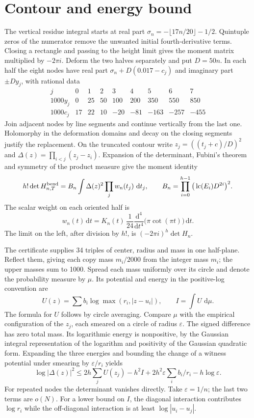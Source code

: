 \documentclass[11pt]{article}
\newcommand{\dd}{\,\mathrm d}
\begin{document}
\section{Contour and energy bound}
The vertical residue integral starts at real part
$\sigma_n=-\lfloor17n/20\rfloor-1/2$. Quintuple zeros of the numerator
remove the unwanted initial fourth-derivative terms. Closing a rectangle
and passing to the height limit gives the moment matrix multiplied by
$-2\pi i$. Deform the two halves separately and put $D=50n$. In each half
the eight nodes have real part $\sigma_n+D(0.017-c_j)$ and imaginary
part $\pm D y_j$, with rational data
\[
\begin{array}{c|rrrrrrrr}
j&0&1&2&3&4&5&6&7\\ \hline
1000y_j&0&25&50&100&200&350&550&850\\
1000c_j&17&22&10&-20&-81&-163&-257&-455
\end{array}
\]
Join adjacent nodes by line segments and continue vertically from the last
one. Holomorphy in the deformation domains and decay on the closing
segments justify the replacement. On the truncated contour write
$z_j=((t_j+c)/D)^2$ and $\Delta(z)=\prod_{i<j}(z_j-z_i)$.
Expansion of the determinant, Fubini's theorem and symmetry of the
product measure give the moment identity
\[
 h!\det H_{n,T}^{\rm bend}=
 B_n\int\Delta(z)^2\prod_j w_n(t_j)\,\dd t_j,\qquad
 B_n=\prod_{i=0}^{h-1}\big(\operatorname{lc}(E_i)D^{2i}\big)^2 .
\]
The scalar weight on each oriented half is
\[
 w_n(t)\dd t=K_n(t)\,\frac{1}{24}
 \frac{\mathrm d^4}{\mathrm dt^4}\big(\pi\cot(\pi t)\big)\dd t .
\] The limit on the left, after division by $h!$, is
$(-2\pi i)^h\det H_n$.

The certificate supplies 34 triples of center, radius and mass in one
half-plane. Reflect them, giving each copy mass $m_i/2000$ from the
integer mass $m_i$; the upper masses sum to 1000. Spread each mass
uniformly over its circle and denote the probability measure by $\mu$.
Its potential and energy in the positive-log convention are
\[
 U(z)=\sum b_i\log\max(r_i,|z-u_i|),\qquad
 I=\int U\,\dd\mu .
\]
The formula for $U$ follows by circle averaging. Compare $\mu$ with the
empirical configuration of the $z_j$, each smeared on a circle of radius
$\varepsilon$. The signed difference has zero total mass. Its logarithmic
energy is nonpositive, by the Gaussian integral representation of the
logarithm and positivity of the Gaussian quadratic form. Expanding the
three energies and bounding the change of a witness potential under
smearing by $\varepsilon/r_i$ yields
\[
 \log|\Delta(z)|^2\le
 2h\sum_j U(z_j)-h^2 I+
 2h^2\varepsilon\sum_i b_i/r_i-h\log\varepsilon .
\]
For repeated nodes the determinant vanishes directly. Take
$\varepsilon=1/n$; the last two terms are $o(N)$. For a lower bound on
$I$, the diagonal interaction contributes $\log r_i$ while the
off-diagonal interaction is at least $\log|u_i-u_j|$.
\end{document}
